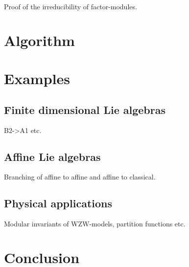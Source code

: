 \documentclass[a4paper,12pt]{article}
\theoremstyle{definition} \newtheorem{Def}{Definition}
\begin{document}
Proof of the irreducibility of factor-modules.

\section{Algorithm}
\label{sec:algorithm}


\section{Examples}
\label{sec:examples}

\subsection{Finite dimensional Lie algebras}
\label{sec:finite-dimens-lie}

B2->A1 etc.

\subsection{Affine Lie algebras}
\label{sec:affine-lie-algebras}

Branching of affine to affine and affine to classical.
\subsection{Physical applications}
\label{sec:phys-appl}

Modular invariants of WZW-models, partition functions etc.

\section{Conclusion}
\label{sec:conclusion}

{}

\end{document}
